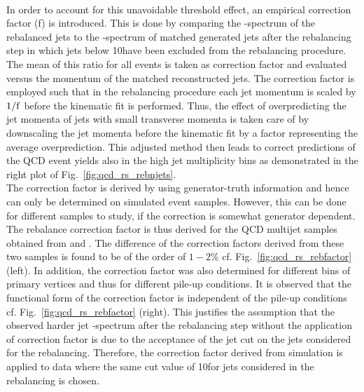 \\
In order to account for this unavoidable threshold effect, an empirical correction factor (f) is introduced. This is done by comparing the \pt-spectrum of the rebalanced jets to the \pt-spectrum of matched generated jets after the rebalancing step in which jets below 10\gev have been excluded from the rebalancing procedure. The mean of this ratio for all events is taken as correction factor and evaluated versus the momentum of the matched reconstructed jets. The correction factor is employed such that in the rebalancing procedure each jet momentum is scaled by $1/\rm{f}$ before the kinematic fit is performed. Thus, the effect of overpredicting the jet momenta of jets with small transverse momenta is taken care of by downscaling the jet momenta before the kinematic fit by a factor representing the average overprediction. This adjusted method then leads to correct predictions of the QCD event yields also in the high jet multiplicity bins as demonstrated in the right plot of Fig.~\ref{fig:qcd_rs_rebnjets}.\\
The correction factor is derived by using generator-truth information and hence can only be determined on simulated event samples. However, this can be done for different samples to study, if the correction is somewhat generator dependent. The rebalance correction factor is thus derived for the QCD multijet samples obtained from \pythia and \madgraph. The difference of the correction factors derived from these two samples is found to be of the order of $1-2\%$ cf. Fig.~\ref{fig:qcd_rs_rebfactor} (left). In addition, the correction factor was also determined for different bins of primary vertices and thus for different pile-up conditions. It is observed that the functional form of the correction factor is independent of the pile-up conditions cf. Fig.~\ref{fig:qcd_rs_rebfactor} (right). This justifies the assumption that the observed harder jet \pt-spectrum after the rebalancing step without the application of correction factor is due to the acceptance of the jet \pt cut on the jets considered for the rebalancing. Therefore, the correction factor derived from simulation is applied to data where the same \pt cut value of 10\gev for jets considered in the rebalancing is chosen. 

